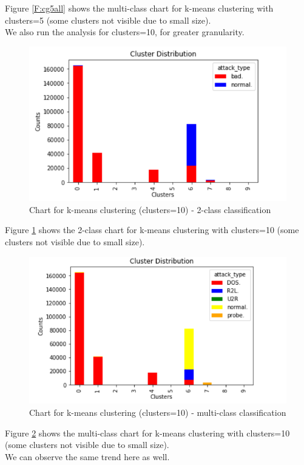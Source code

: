Figure \ref{F:cg5all} shows the multi-class chart for k-means clustering with clusters=5 (some clusters not visible due to small size).\\
We also run the analysis for clusters=10, for greater granularity.
\begin{figure}
	\includegraphics[width=1.0\columnwidth]{images/cluster102graph.PNG}
	\caption{Chart for k-means clustering (clusters=10) - 2-class classification}
	\label{F:cg102}
\end{figure}
Figure \ref{F:cg102} shows the 2-class chart for k-means clustering with clusters=10 (some clusters not visible due to small size).\\
\begin{figure}
	\includegraphics[width=1.0\columnwidth]{images/cluster10allgraph.PNG}
	\caption{Chart for k-means clustering (clusters=10) - multi-class classification}
	\label{F:cg10all}
\end{figure}
Figure \ref{F:cg10all} shows the multi-class chart for k-means clustering with clusters=10 (some clusters not visible due to small size).\\
We can observe the same trend here as well.

